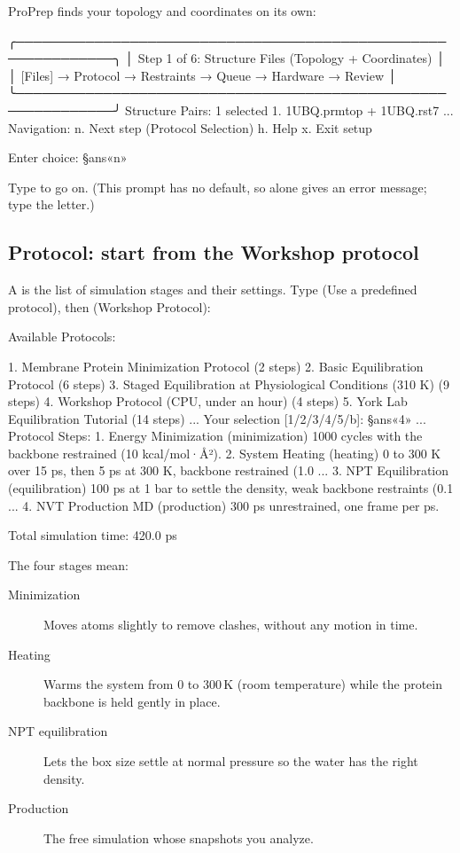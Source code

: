 ProPrep finds your topology and coordinates on its own:

\begin{screen}
╭─────────────────────────────────────────────────────────────╮
│ Step 1 of 6: Structure Files (Topology + Coordinates)       │
│ [Files] → Protocol → Restraints → Queue → Hardware → Review │
╰─────────────────────────────────────────────────────────────╯
  Structure Pairs: 1 selected
    1. 1UBQ.prmtop + 1UBQ.rst7
...
Navigation:
   n. Next step (Protocol Selection)
   h. Help
   x. Exit setup

Enter choice: §ans«n»
\end{screen}

Type  to go on. (This prompt has no default, so  alone gives
an error message; type the letter.)

\subsection{Protocol: start from the Workshop protocol}

A  is the list of simulation stages and their settings. Type
 (Use a predefined protocol), then  (Workshop Protocol):

\begin{screen}
Available Protocols:

  1. Membrane Protein Minimization Protocol (2 steps)
  2. Basic Equilibration Protocol (6 steps)
  3. Staged Equilibration at Physiological Conditions (310 K) (9 steps)
  4. Workshop Protocol (CPU, under an hour) (4 steps)
  5. York Lab Equilibration Tutorial (14 steps)
...
Your selection [1/2/3/4/5/b]: §ans«4»
...
Protocol Steps:
  1. Energy Minimization (minimization)
     1000 cycles with the backbone restrained (10 kcal/mol·Å²).
  2. System Heating (heating)
     0 to 300 K over 15 ps, then 5 ps at 300 K, backbone restrained (1.0 ...
  3. NPT Equilibration (equilibration)
     100 ps at 1 bar to settle the density, weak backbone restraints (0.1 ...
  4. NVT Production MD (production)
     300 ps unrestrained, one frame per ps.

Total simulation time: 420.0 ps
\end{screen}

The four stages mean:
\begin{description}
  \item[Minimization] Moves atoms slightly to remove clashes, without any
        motion in time.
  \item[Heating] Warms the system from 0 to 300\,K (room temperature) while
        the protein backbone is held gently in place.
  \item[NPT equilibration] Lets the box size settle at normal pressure so the
        water has the right density.
  \item[Production] The free simulation whose snapshots you analyze.
\end{description}


